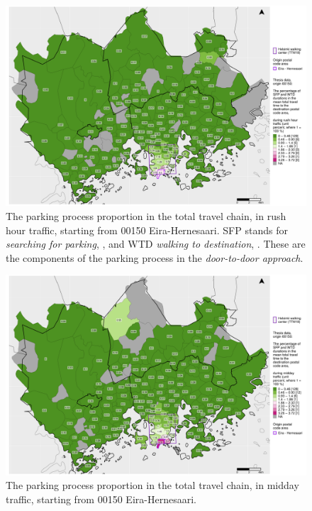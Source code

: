 \begin{figure}[H]%
    \centering
    \includegraphics[trim={0.9cm 0.3cm 0.25cm 0.3cm},clip,width=\textwidth]{images/compare_traveltimes_mapfill-msc_r_pct_fromzip-00150_28-09-2020.png}
    \caption[Parking process proportion from Eira-Hernesaari, rush hour traffic]{The parking process proportion in the total travel chain, in rush hour traffic, starting from 00150 Eira-Hernesaari. SFP stands for \textit{searching for parking}, , and WTD \textit{walking to destination}, . These are the components of the parking process in the \textit{door-to-door approach}.}%
    \label{fig:compare_msc_r_pct_00150}%
\end{figure}

\begin{figure}[H]%
    \centering
    \includegraphics[trim={0.9cm 0.3cm 0.25cm 0.3cm},clip,width=\textwidth]{images/compare_traveltimes_mapfill-msc_m_pct_fromzip-00150_28-09-2020.png}
    \caption[Parking process proportion from Eira-Hernesaari, midday traffic]{The parking process proportion in the total travel chain, in midday traffic, starting from 00150 Eira-Hernesaari.}%
    \label{fig:compare_msc_m_pct_00150}%
\end{figure}


